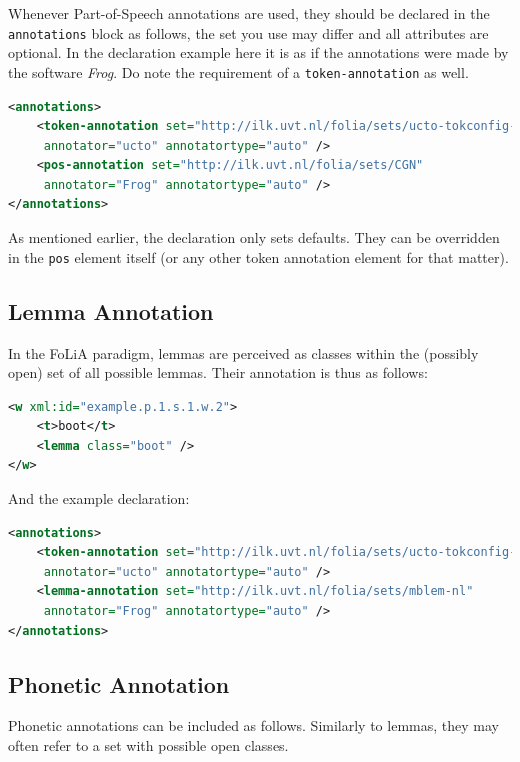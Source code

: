 \documentclass[a4paper,12pt]{report}
\begin{document}
Whenever Part-of-Speech annotations are used, they should be declared in the \texttt{annotations} block as follows, the set you use may differ and all attributes are optional. In the declaration example here it is as if the annotations were made by the software \emph{Frog}. Do note the requirement of a \texttt{token-annotation} as well.

\begin{lstlisting}[language=xml]
<annotations>
    <token-annotation set="http://ilk.uvt.nl/folia/sets/ucto-tokconfig-nl" 
     annotator="ucto" annotatortype="auto" />
    <pos-annotation set="http://ilk.uvt.nl/folia/sets/CGN" 
     annotator="Frog" annotatortype="auto" />
</annotations>
\end{lstlisting}

As mentioned earlier, the declaration only sets defaults. They can be overridden in the \texttt{pos} element itself (or any other token annotation element for that matter).

\subsection{Lemma Annotation}

In the FoLiA paradigm, lemmas are perceived as classes within the (possibly open) set of all possible lemmas. Their annotation is thus as follows:

\begin{lstlisting}[language=xml]
<w xml:id="example.p.1.s.1.w.2">
    <t>boot</t>
    <lemma class="boot" />
</w>
\end{lstlisting}

And the example declaration:

\begin{lstlisting}[language=xml]
<annotations>
    <token-annotation set="http://ilk.uvt.nl/folia/sets/ucto-tokconfig-nl" 
     annotator="ucto" annotatortype="auto" />
    <lemma-annotation set="http://ilk.uvt.nl/folia/sets/mblem-nl"
     annotator="Frog" annotatortype="auto" />
</annotations>
\end{lstlisting}

\subsection{Phonetic Annotation}

Phonetic annotations can be included as follows. Similarly to lemmas, they may often refer to a set with possible open classes.
\end{document}
